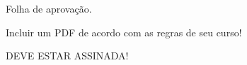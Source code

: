 

%   

\begin{folhadeaprovacao}
  \begin{destaque}
    \large \centering
    Folha de aprovação.
    \vspace*{2cm}

    Incluir um PDF de acordo com as regras de seu curso!
    \vspace*{2cm}

    \Huge DEVE ESTAR ASSINADA!
  \end{destaque}
\end{folhadeaprovacao}

\cleardoublepage

